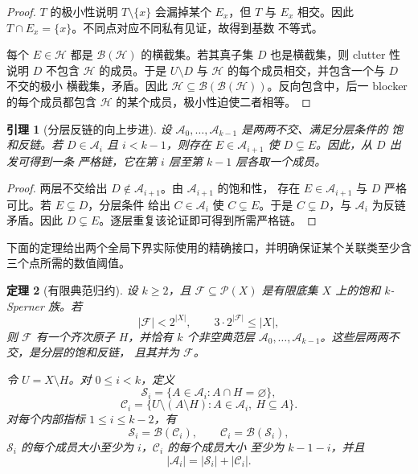 \documentclass[UTF8,11pt,a4paper,fontset=fandol]{ctexart}
\newtheorem{theorem}{定理}[section]
\newtheorem{lemma}[theorem]{引理}
\theoremstyle{definition}
\theoremstyle{remark}
\newcommand{\powerset}{\mathcal{P}}
\newcommand{\family}{\mathcal{F}}
\newcommand{\blocker}{\mathcal{B}}
\begin{document}
\begin{proof}
$T$ 的极小性说明 $T\setminus\{x\}$ 会漏掉某个 $E_x$，但 $T$ 与
$E_x$ 相交。因此 $T\cap E_x=\{x\}$。不同点对应不同私有见证，故得到基数
不等式。

每个 $E\in\mathcal H$ 都是 $\blocker(\mathcal H)$ 的横截集。若其真子集
$D$ 也是横截集，则 clutter 性说明 $D$ 不包含 $\mathcal H$ 的成员。于是
$U\setminus D$ 与 $\mathcal H$ 的每个成员相交，并包含一个与 $D$ 不交的极小
横截集，矛盾。因此
$\mathcal H\subseteq\blocker(\blocker(\mathcal H))$。反向包含中，后一
blocker 的每个成员都包含 $\mathcal H$ 的某个成员，极小性迫使二者相等。
\end{proof}

\begin{lemma}[分层反链的向上步进]
\label{lem:upward-step}
设 $\mathcal A_0,\ldots,\mathcal A_{k-1}$ 是两两不交、满足分层条件的
饱和反链。若 $D\in\mathcal A_i$ 且 $i<k-1$，则存在
$E\in\mathcal A_{i+1}$ 使 $D\subsetneq E$。因此，从 $D$ 出发可得到一条
严格链，它在第 $i$ 层至第 $k-1$ 层各取一个成员。
\end{lemma}

\begin{proof}
两层不交给出 $D\notin\mathcal A_{i+1}$。由 $\mathcal A_{i+1}$ 的饱和性，
存在 $E\in\mathcal A_{i+1}$ 与 $D$ 严格可比。若 $E\subsetneq D$，分层条件
给出 $C\in\mathcal A_i$ 使 $C\subsetneq E$。于是
$C\subsetneq D$，与 $\mathcal A_i$ 为反链矛盾。因此
$D\subsetneq E$。逐层重复该论证即可得到所需严格链。
\end{proof}

下面的定理给出两个全局下界实际使用的精确接口，并明确保证某个关联类至少含
三个点所需的数值阈值。

\begin{theorem}[有限典范归约]
\label{thm:canonical-reduction}
设 $k\geq2$，且 $\family\subseteq\powerset(X)$ 是有限底集 $X$ 上的饱和
$k$-Sperner 族。若
\[
  |\family|<2^{|X|},\qquad 3\cdot2^{|\family|}\leq|X|,       \tag{CR1}
\]
则 $\family$ 有一个齐次原子 $H$，并恰有 $k$ 个非空典范层
$\mathcal A_0,\ldots,\mathcal A_{k-1}$。这些层两两不交，是分层的饱和反链，
且其并为 $\family$。

令 $U=X\setminus H$。对 $0\leq i<k$，定义
\[
 \mathcal S_i=\{A\in\mathcal A_i:A\cap H=\varnothing\},
\]
\[
 \mathcal C_i=
 \{U\setminus(A\setminus H):A\in\mathcal A_i,\ H\subseteq A\}.
\]
对每个内部指标 $1\leq i\leq k-2$，有
\[
 \mathcal S_i=\blocker(\mathcal C_i),\qquad
 \mathcal C_i=\blocker(\mathcal S_i),                       \tag{CR2}
\]
$\mathcal S_i$ 的每个成员大小至少为 $i$，$\mathcal C_i$ 的每个成员大小
至少为 $k-1-i$，并且
\[
 |\mathcal A_i|=|\mathcal S_i|+|\mathcal C_i|.              \tag{CR3}
\]
\end{theorem}
\end{document}
